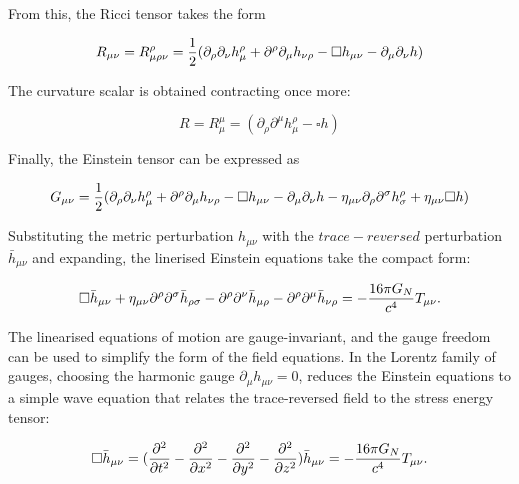 \documentclass[binding=0.6cm, LaM]{sapthesis}
\begin{document}
	From this, the Ricci tensor takes the form

		\begin{equation}
		R_{\mu\nu} = R^{\rho}_{\mu\rho\nu} = {1 \over 2}(\partial_{\rho}\partial_{\nu}h^{\rho}_{\mu} + \partial^{\rho}\partial_{\mu}h_{\nu\rho} - \square h_{\mu\nu} - \partial_{\mu}\partial_{\nu}h)
		\end{equation}

	The curvature scalar is obtained contracting once more:

		\begin{equation}
		R = R^{\mu}_{\mu} = (\partial_{\rho}\partial^{\mu}h^{\rho}_{\mu} - \square h)
		\end{equation}

	Finally, the Einstein tensor can be expressed as
	
		\begin{equation}
		G_{\mu\nu} = {1 \over 2}(\partial_{\rho}\partial_{\nu}h^{\rho}_{\mu} + \partial^{\rho}\partial_{\mu}h_{\nu\rho} - \square h_{\mu\nu} - \partial_{\mu}\partial_{\nu}h - \eta_{\mu\nu}\partial_{\rho}\partial^{\sigma}h^{\rho}_{\sigma} + \eta_{\mu\nu}\square h)
		\end{equation}

	Substituting the metric perturbation $h_{\mu\nu}$  with the $trace-reversed$ perturbation ${\bar h}_{\mu\nu}$ and expanding, 
	the linerised Einstein equations take the  compact form:

		\begin{equation}
		\square {\bar h}_{\mu\nu} + \eta_{\mu\nu}{\partial}^{\rho}{\partial}^{\sigma}{\bar h}_{\rho\sigma} - {\partial}^{\rho}{\partial}^{\nu}{\bar h}_{\mu\rho} - {\partial}^{\rho}{\partial}^{\mu}{\bar h}_{\nu\rho} = - {{16\pi G_{N}} \over {c^4}}T_{\mu\nu}.
		\end{equation}

	The linearised equations of motion are gauge-invariant, and the gauge freedom can
 	be used to simplify the form of the field equations.
 	In the Lorentz family of gauges, choosing the harmonic gauge $ \partial_{\mu}h_{\mu\nu} = 0 $, 
	reduces the Einstein equations to a simple wave equation that relates the trace-reversed field
 	to the stress energy tensor:

		\begin{equation}
		\square {\bar h}_{\mu\nu} =({\partial^2 \over {\partial t^2} } - {\partial^2 \over {\partial x^2}}  - {\partial^2 \over {\partial y^2}}  -  {\partial^2 \over {\partial z^2}}) {\bar h}_{\mu\nu} = -{{16\pi G_{N}} \over {c^4}}T_{\mu\nu}. 
		\end{equation}
\end{document}
